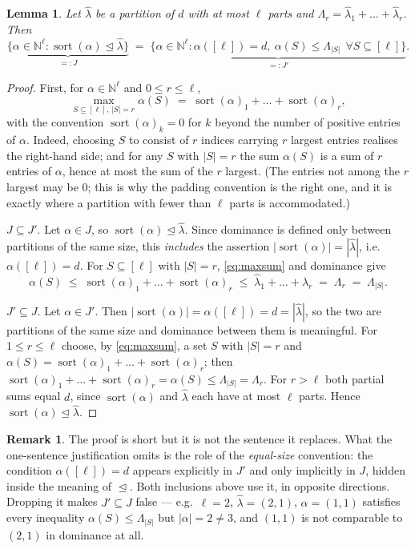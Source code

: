 \documentclass[11pt]{article}
\theoremstyle{plain}
\newtheorem{lem}[thm]{Lemma}
\theoremstyle{definition}
\newtheorem{rem}[thm]{Remark}
\DeclareMathOperator{\srt}{sort}
\newcommand{\N}{\mathbb{N}}
\newcommand{\lhat}{\hat\lambda}
\begin{document}
\begin{lem}\label{lem:JJ}
Let $\lhat$ be a partition of $d$ with at most $\ell$ parts and
$\Lambda_r=\lhat_1+\dots+\lhat_r$. Then
\[
  \underbrace{\{\alpha\in\N^{\ell}:\srt(\alpha)\trianglelefteq\lhat\}}_{=:J}
  \;=\;
  \underbrace{\{\alpha\in\N^{\ell}:\alpha([\ell])=d,\
   \alpha(S)\le\Lambda_{|S|}\ \ \forall S\subseteq[\ell]\}}_{=:J'}.
\]
\end{lem}

\begin{proof}
First, for $\alpha\in\N^{\ell}$ and $0\le r\le\ell$,
\begin{equation}\label{eq:maxsum}
  \max_{S\subseteq[\ell],\,|S|=r}\alpha(S)\;=\;\srt(\alpha)_1+\dots+\srt(\alpha)_r,
\end{equation}
with the convention $\srt(\alpha)_k=0$ for $k$ beyond the number of positive
entries of $\alpha$. Indeed, choosing $S$ to consist of $r$ indices carrying $r$
largest entries realises the right-hand side; and for any $S$ with $|S|=r$ the
sum $\alpha(S)$ is a sum of $r$ entries of $\alpha$, hence at most the sum of the
$r$ largest. (The entries not among the $r$ largest may be $0$; this is why the
padding convention is the right one, and it is exactly where a partition with
fewer than $\ell$ parts is accommodated.)

$J\subseteq J'$. Let $\alpha\in J$, so $\srt(\alpha)\trianglelefteq\lhat$. Since
dominance is defined only between partitions of the same size, this \emph{includes}
the assertion $|\srt(\alpha)|=|\lhat|$, i.e.\ $\alpha([\ell])=d$. For
$S\subseteq[\ell]$ with $|S|=r$, \eqref{eq:maxsum} and dominance give
\[
  \alpha(S)\;\le\;\srt(\alpha)_1+\dots+\srt(\alpha)_r\;\le\;\lhat_1+\dots+\lhat_r
  \;=\;\Lambda_r\;=\;\Lambda_{|S|}.
\]

$J'\subseteq J$. Let $\alpha\in J'$. Then $|\srt(\alpha)|=\alpha([\ell])=d=|\lhat|$,
so the two are partitions of the same size and dominance between them is
meaningful. For $1\le r\le\ell$ choose, by \eqref{eq:maxsum}, a set $S$ with
$|S|=r$ and $\alpha(S)=\srt(\alpha)_1+\dots+\srt(\alpha)_r$; then
$\srt(\alpha)_1+\dots+\srt(\alpha)_r=\alpha(S)\le\Lambda_{|S|}=\Lambda_r$. For
$r>\ell$ both partial sums equal $d$, since $\srt(\alpha)$ and $\lhat$ each have
at most $\ell$ parts. Hence $\srt(\alpha)\trianglelefteq\lhat$.
\end{proof}

\begin{rem}\label{rem:equalsize}
The proof is short but it is not the sentence it replaces. What the one-sentence
justification omits is the role of the \emph{equal-size} convention: the
condition $\alpha([\ell])=d$ appears explicitly in $J'$ and only implicitly in
$J$, hidden inside the meaning of $\trianglelefteq$. Both inclusions above use
it, in opposite directions. Dropping it makes $J'\subseteq J$ false --- e.g.\
$\ell=2$, $\lhat=(2,1)$, $\alpha=(1,1)$ satisfies every inequality
$\alpha(S)\le\Lambda_{|S|}$ but $|\alpha|=2\ne 3$, and $(1,1)$ is not comparable
to $(2,1)$ in dominance at all.
\end{rem}
\end{document}
